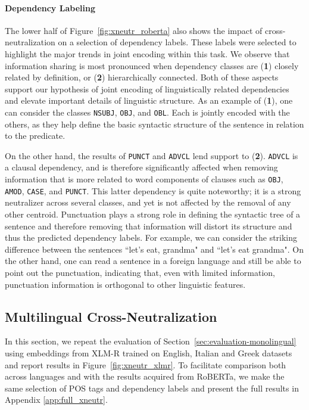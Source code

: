 \documentclass[11pt,a4paper]{article}
\begin{document}
\paragraph{Dependency Labeling}
The lower half of Figure~\ref{fig:xneutr_roberta} also shows the impact of cross-neutralization on a selection of dependency labels. These labels were selected to highlight the major trends in joint encoding within this task. We observe that information sharing is most pronounced when dependency classes are (\textbf{1}) closely related by definition, or (\textbf{2}) hierarchically connected. Both of these aspects support our hypothesis of joint encoding of linguistically related dependencies and elevate important details of linguistic structure. As an example of (\textbf{1}), one can consider the classes \texttt{NSUBJ}, \texttt{OBJ}, and \texttt{OBL}. Each is jointly encoded with the others, as they help define the basic syntactic structure of the sentence in relation to the predicate. 

On the other hand, the results of \texttt{PUNCT} and \texttt{ADVCL} lend support to (\textbf{2}). \texttt{ADVCL} is a clausal dependency, and is therefore significantly affected when removing information that is more related to word components of clauses such as \texttt{OBJ}, \texttt{AMOD}, \texttt{CASE}, and \texttt{PUNCT}. This latter dependency is quite noteworthy; it is a strong neutralizer across several classes, and yet is not affected by the removal of any other centroid. Punctuation plays a strong role in defining the syntactic tree of a sentence and therefore removing that information will distort its structure and thus the predicted dependency labels. For example, we can consider the striking difference between the sentences ``let's eat, grandma" and ``let's eat grandma".
On the other hand, one can read a sentence in a foreign language and still be able to point out the punctuation, indicating that, even with limited information, punctuation information is orthogonal to other linguistic features.

\subsection{Multilingual Cross-Neutralization}
\label{sec:evaluation-multilingual}
In this section, we repeat the evaluation of Section~\ref{sec:evaluation-monolingual} using embeddings from XLM-R trained on English, Italian and Greek datasets and report results in Figure~\ref{fig:xneutr_xlmr}. To facilitate comparison both across languages and with the results acquired from RoBERTa, we make the same selection of POS tags and dependency labels and present the full results in Appendix \ref{app:full_xneutr}.
\end{document}
